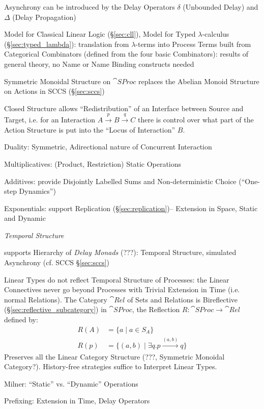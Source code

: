 Asynchrony can be introduced by the Delay Operators $\delta$
(Unbounded Delay) and $\Delta$ (Delay Propagation)

Model for Classical Linear Logic (\S\ref{sec:cll}), Model for Typed
$\lambda$-calculus (\S\ref{sec:typed_lambda}): translation from
$\lambda$-terms into Process Terms built from Categorical Combinators
(defined from the four basic Combinators): results of general theory,
no Name or Name Binding constructs needed

Symmetric Monoidal Structure on $\cat{SProc}$ replaces the Abelian
Monoid Structure on Actions in SCCS (\S\ref{sec:sccs})

Closed Structure allows ``Redistribution'' of an Interface between
Source and Target, i.e. for an Interaction $A \xrightarrow{p} B
\xrightarrow{q} C$ there is control over what part of the Action
Structure is put into the ``Locus of Interaction'' $B$.

Duality: Symmetric, Adirectional nature of Concurrent Interaction

Multiplicatives: (Product, Restriction) Static Operations

Additives: provide Disjointly Labelled Sums and Non-deterministic
Choice (``One-step Dynamics'')

Exponentials: support Replication (\S\ref{sec:replication})--
Extension in Space, Static and Dynamic


\emph{Temporal Structure}

supports Hierarchy of \emph{Delay Monads} (???): Temporal Structure,
simulated Asynchrony (cf. SCCS \S\ref{sec:sccs}) %

Linear Types do not reflect Temporal Structure of Processes: the
Linear Connectives never go beyond Processes with Trivial Extension in
Time (i.e. normal Relations). The Category $\cat{Rel}$ of Sets and
Relations is Bireflective (\S\ref{sec:reflective_subcategory}) in
$\cat{SProc}$, the Reflection $R : \cat{SProc} \rightarrow \cat{Rel}$
defined by:
\begin{align*}
  R(A) &= \{a \mid a \in S_A\} \\
  R(p) &= \{(a,b) \mid \exists q.p \xrightarrow{(a,b)} q\}
\end{align*}
Preserves all the Linear Category Structure (???, Symmetric Monoidal
Category?). History-free strategies suffice to Interpret Linear Types.

Milner: ``Static'' vs. ``Dynamic'' Operations

Prefixing: Extension in Time, Delay Operators

